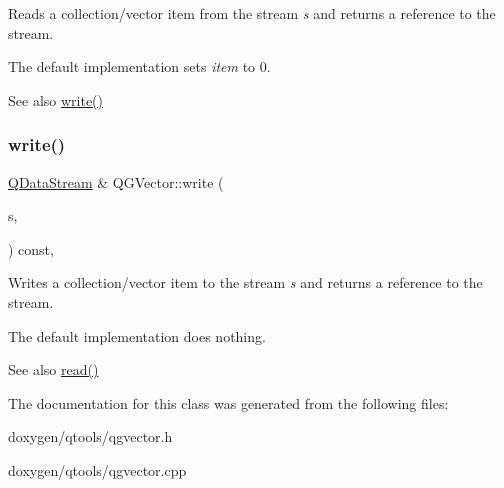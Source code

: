 Reads a collection/vector item from the stream {\itshape s} and returns a reference to the stream.

The default implementation sets {\itshape item} to 0.

\begin{DoxySeeAlso}{See also}
\mbox{\hyperlink{structcmd_8h_af2a3ea719b83f672637febdd87c36c36}{write()}} 
\end{DoxySeeAlso}
\mbox{\label{class_q_g_vector_a0cdc8ad2beacd1077fd68f03ed8492e8}} 
\subsubsection{\texorpdfstring{write()}{write()}}
{\footnotesize\ttfamily \mbox{\hyperlink{class_q_data_stream}{Q\+Data\+Stream}} \& Q\+G\+Vector\+::write (\begin{DoxyParamCaption}\item[{\mbox{\hyperlink{class_q_data_stream}{Q\+Data\+Stream}} \&}]{s,  }\item[{Item}]{ }\end{DoxyParamCaption}) const\hspace{0.3cm}{\ttfamily [protected]}, {\ttfamily [virtual]}}

Writes a collection/vector item to the stream {\itshape s} and returns a reference to the stream.

The default implementation does nothing.

\begin{DoxySeeAlso}{See also}
\mbox{\hyperlink{structcmd_8h_a9c7b76d5266903891c803132d51ccb90}{read()}} 
\end{DoxySeeAlso}


The documentation for this class was generated from the following files\+:\begin{DoxyCompactItemize}
\item 
doxygen/qtools/qgvector.\+h\item 
doxygen/qtools/qgvector.\+cpp\end{DoxyCompactItemize}
